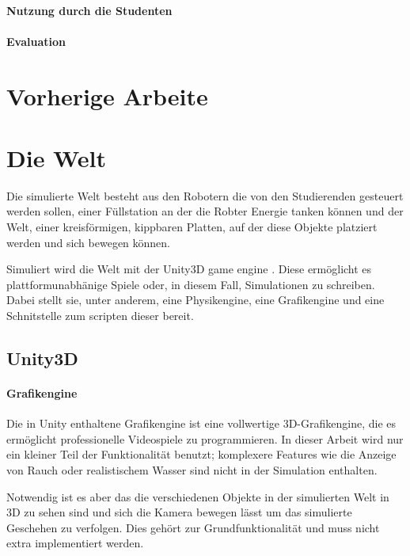 ﻿\documentclass[
    12pt,
    bibliography=totoc,
    ngerman
]{scrartcl}
\begin{document}

\paragraph{Nutzung durch die Studenten} 

\paragraph{Evaluation}

\clearpage
\section{Vorherige Arbeite}


\clearpage
\section{Die Welt}
Die simulierte Welt besteht aus den Robotern die von den Studierenden gesteuert werden sollen, einer F{\"{u}}llstation an der die Robter Energie tanken k{\"{o}}nnen und
der Welt, einer kreisf{\"{o}}rmigen, kippbaren Platten, auf der diese Objekte platziert werden und sich bewegen k{\"{o}}nnen.

Simuliert wird die Welt mit der Unity3D game engine . Diese erm{\"{o}}glicht es plattformunabh{\"{a}}nige Spiele oder, in diesem Fall, Simulationen zu schreiben.
Dabei stellt sie, unter anderem, eine Physikengine, eine Grafikengine und eine Schnitstelle zum scripten dieser bereit. 

\subsection{Unity3D}
\paragraph{Grafikengine}
Die in Unity enthaltene Grafikengine ist eine vollwertige 3D-Grafikengine, die es erm{\"{o}}glicht professionelle Videospiele zu programmieren. In dieser Arbeit wird nur
ein kleiner Teil der Funktionalit{\"{a}}t benutzt; komplexere Features wie die Anzeige von Rauch oder realistischem Wasser sind nicht in der Simulation enthalten.

Notwendig ist es aber das die verschiedenen Objekte in der simulierten Welt in 3D zu sehen sind und sich die Kamera bewegen l{\"{a}}sst um das simulierte Geschehen zu
verfolgen. Dies geh{\"{o}}rt zur Grundfunktionalit{\"{a}}t und muss nicht extra implementiert werden.
\end{document}
